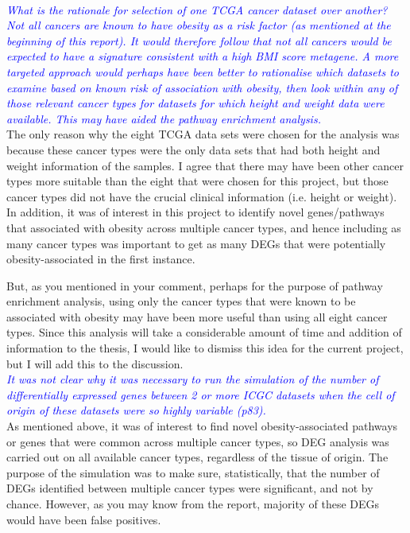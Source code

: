 \documentclass[a4paper, 12pt]{article}
\begin{document}
\noindent
\\

\noindent
\textcolor{blue}{
\textit{What is the rationale for selection of one TCGA cancer dataset over another?
Not all cancers are known to have obesity as a risk factor (as mentioned at the beginning of this report).
It would therefore follow that not all cancers would be expected to have a signature consistent with a high BMI score metagene.
A more targeted approach would perhaps have been better to rationalise which datasets to examine based on known risk of association with obesity, then look within any of those relevant cancer types for datasets for which height and weight data were available.
This may have aided the pathway enrichment analysis.
}
}\\

\noindent
The only reason why the eight TCGA data sets were chosen for the analysis was because these cancer types were the only data sets that had both height and weight information of the samples.
I agree that there may have been other cancer types more suitable than the eight that were chosen for this project, but those cancer types did not have the crucial clinical information (i.e. height or weight).
In addition, it was of interest in this project to identify novel genes/pathways that associated with obesity across multiple cancer types, and hence including as many cancer types was important to get as many DEGs that were potentially obesity-associated in the first instance.

But, as you mentioned in your comment, perhaps for the purpose of pathway enrichment analysis, using only the cancer types that were known to be associated with obesity may have been more useful than using all eight cancer types.
Since this analysis will take a considerable amount of time and addition of information to the thesis, I would like to dismiss this idea for the current project, but I will add this to the discussion.
\\

\noindent
\textcolor{blue}{
\textit{It was not clear why it was necessary to run the simulation of the number of differentially expressed genes between 2 or more ICGC datasets when the cell of origin of these datasets were so highly variable (p83).
}
}\\

\noindent
As mentioned above, it was of interest to find novel obesity-associated pathways or genes that were common across multiple cancer types, so DEG analysis was carried out on all available cancer types, regardless of the tissue of origin.
The purpose of the simulation was to make sure, statistically, that the number of DEGs identified between multiple cancer types were significant, and not by chance.
However, as you may know from the report, majority of these DEGs would have been false positives.
\end{document}
